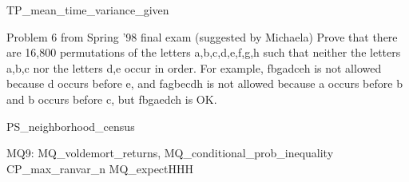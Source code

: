 TP_mean_time_variance_given

Problem 6 from Spring '98 final exam (suggested by Michaela)
  Prove that there are 16,800 permutations of the letters
  {a,b,c,d,e,f,g,h} such that neither the letters {a,b,c} nor the
  letters {d,e} occur in order. For example, fbgadceh is not allowed
  because d occurs before e, and fagbecdh is not allowed because a
  occurs before b and b occurs before c, but fbgaedch is OK.

PS_neighborhood_census

MQ9:
MQ_voldemort_returns,
MQ_conditional_prob_inequality
CP_max_ranvar_n
MQ_expectHHH
